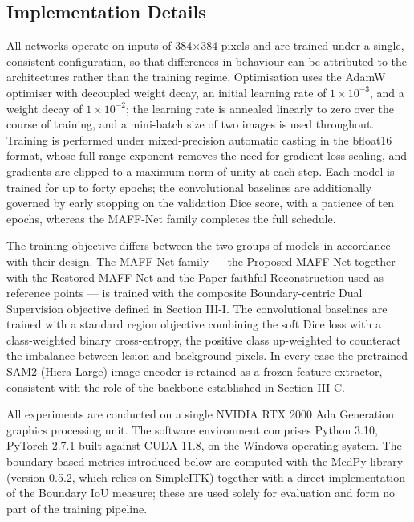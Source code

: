 \subsection{Implementation Details}

All networks operate on inputs of 384$\times$384 pixels and are trained under a single, consistent configuration, so that differences in behaviour can be attributed to the architectures rather than the training regime. Optimisation uses the AdamW optimiser with decoupled weight decay, an initial learning rate of $1\times10^{-3}$, and a weight decay of $1\times10^{-2}$; the learning rate is annealed linearly to zero over the course of training, and a mini-batch size of two images is used throughout. Training is performed under mixed-precision automatic casting in the bfloat16 format, whose full-range exponent removes the need for gradient loss scaling, and gradients are clipped to a maximum norm of unity at each step. Each model is trained for up to forty epochs; the convolutional baselines are additionally governed by early stopping on the validation Dice score, with a patience of ten epochs, whereas the MAFF-Net family completes the full schedule.

The training objective differs between the two groups of models in accordance with their design. The MAFF-Net family --- the Proposed MAFF-Net together with the Restored MAFF-Net and the Paper-faithful Reconstruction used as reference points --- is trained with the composite Boundary-centric Dual Supervision objective defined in Section III-I. The convolutional baselines are trained with a standard region objective combining the soft Dice loss with a class-weighted binary cross-entropy, the positive class up-weighted to counteract the imbalance between lesion and background pixels. In every case the pretrained SAM2 (Hiera-Large) image encoder \cite{ref10} is retained as a frozen feature extractor, consistent with the role of the backbone established in Section III-C.

All experiments are conducted on a single NVIDIA RTX 2000 Ada Generation graphics processing unit. The software environment comprises Python 3.10, PyTorch 2.7.1 built against CUDA 11.8, on the Windows operating system. The boundary-based metrics introduced below are computed with the MedPy library (version 0.5.2, which relies on SimpleITK) \cite{ref23} together with a direct implementation of the Boundary IoU measure; these are used solely for evaluation and form no part of the training pipeline.

